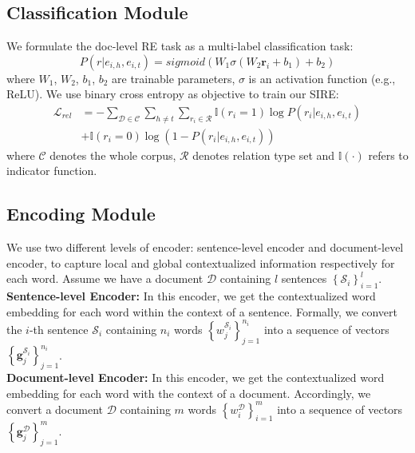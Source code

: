 \documentclass[11pt,a4paper]{article}
\begin{document}
\subsection{Classification Module\label{ssec:classification}}
We formulate the doc-level RE task as a multi-label classification task:
\begin{equation}
    P(r|e_{i,h}, e_{i,t}) = sigmoid \left(W_1 \sigma (W_2 \textbf{r}_{i} + b_1) + b_2 \right)
\end{equation}
where $W_1$, $W_2$, $b_1$, $b_2$ are trainable parameters, $\sigma$ is an activation function (e.g., ReLU). We use binary cross entropy as objective to train our SIRE:
\begin{equation}
\begin{split}
    \mathcal{L}_{rel} &= - \sum _{\mathcal{D} \in \mathcal{C}}  \sum _{h\neq t} \sum_{r_i \in \mathcal{R}}  \mathbb I \left ( r_i=1 \right ) \log P \left ( r_i|e_{i,h}, e_{i,t} \right )
    \\
     & +  \mathbb I \left ( r_i=0 \right ) \log \left(  1 - P \left ( r_i|e_{i,h}, e_{i,t} \right ) \right )
\end{split}
\end{equation}
where $\mathcal{C}$ denotes the whole corpus, $\mathcal{R}$ denotes relation type set and $\mathbb I\left(\cdot\right)$ refers to indicator function.





























\iffalse
\subsection{Encoding Module\label{ssec:encoding}}
We use two different levels of encoder: sentence-level encoder and document-level encoder, to capture local and global contextualized information respectively for each word. Assume we have a document $\mathcal{D}$ containing $l$ sentences $\left\{\mathcal{S}_{i}\right\}^{l}_{i=1}$. \\
\noindent
\textbf{Sentence-level Encoder:} In this encoder, we get the contextualized word embedding for each word within the context of a sentence. Formally, we convert the $i$-th sentence $\mathcal{S}_{i}$ containing $n_i$ words $\left\{w^{\mathcal{S}_{i}}_j\right\}^{n_i}_{j=1}$ into a sequence of vectors $\left\{\textbf{g}^{\mathcal{S}_{i}}_{j}\right\}^{n_i}_{j=1}$. \\
\noindent
\textbf{Document-level Encoder:} In this encoder, we get the contextualized word embedding for each word with the context of a document. Accordingly, we convert a document $\mathcal{D}$ containing $m$ words  $\left\{w^{\mathcal{D}}_i\right\}^{m}_{i=1}$ into a sequence of vectors $\left\{\textbf{{g}}^{\mathcal{D}}_{j}\right\}^{m}_{j=1}$.
\end{document}
